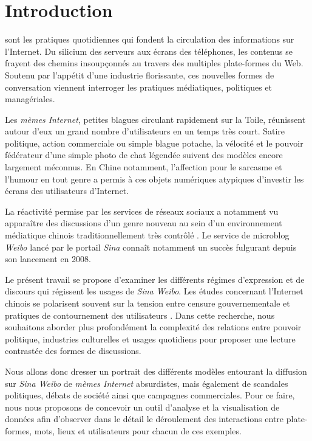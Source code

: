 \chapter*{Introduction}


 sont les pratiques quotidiennes qui fondent la circulation des informations sur l'Internet. Du silicium des serveurs aux écrans des téléphones, les contenus se frayent des chemins insoupçonnés au travers des multiples plate-formes du Web. Soutenu par l'appétit d'une industrie florissante, ces nouvelles formes de conversation viennent interroger les pratiques médiatiques, politiques et managériales. 

Les \textit{mèmes Internet}, petites blagues circulant rapidement sur la Toile, réunissent autour d'eux un grand nombre d'utilisateurs en un temps très court. Satire politique, action commerciale ou simple blague potache, la vélocité et le pouvoir fédérateur d'une simple photo de chat légendée suivent des modèles encore largement méconnus. En Chine notamment, l'affection pour le sarcasme et l'humour en tout genre a permis à ces objets numériques atypiques d'investir les écrans des utilisateurs d'Internet.

La réactivité permise par les services de réseaux sociaux a notamment vu apparaître des discussions d'un genre nouveau au sein d'un environnement médiatique chinois traditionnellement très contrôlé \citep{MacKinnon2009, Douzet2007, Yang2008}. Le service de microblog \textit{Weibo} lancé par le portail \textit{Sina} connaît notamment un succès fulgurant depuis son lancement en 2008.

Le présent travail se propose d'examiner les différents régimes d'expression et de discours qui régissent les usages de \textit{Sina Weibo}. Les études concernant l'Internet chinois se polarisent souvent sur la tension entre censure gouvernementale \cite{Ng2013a} et pratiques de contournement des utilisateurs \citep{Yang2014}. Dans cette recherche, nous souhaitons aborder plus profondément la complexité des relations entre pouvoir politique, industries culturelles et usages quotidiens pour proposer une lecture contrastée des formes de discussions.

Nous allons donc dresser un portrait des différents modèles entourant la  diffusion sur \textit{Sina Weibo} de \textit{mèmes Internet} absurdistes, mais également de scandales politiques, débats de société ainsi que campagnes commerciales. Pour ce faire, nous nous proposons de concevoir un outil d'analyse et la visualisation de données afin d'observer dans le détail le déroulement des interactions entre plate-formes, mots, lieux et utilisateurs pour chacun de ces exemples.


